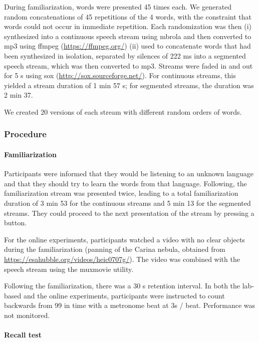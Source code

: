 \documentclass[]{article}
\let\oldparagraph\paragraph
\renewcommand{\paragraph}[1]{\oldparagraph{#1}\mbox{}}
\begin{document}
During familiarization, words were presented 45 times each. We generated random concatenations of 45 repetitions of the 4 words, with the constraint that words could not occur in immediate repetition. Each randomization was then (i) synthesized into a continuous speech stream using mbrola and then converted to mp3 using ffmpeg (\url{https://ffmpeg.org/}) (ii) used to concatenate words that had been synthesized in isolation, separated by silences of 222 ms into a segmented speech stream, which was then converted to mp3. Streams were faded in and out for 5 s using sox (\url{http://sox.sourceforge.net/}). For continuous streams, this yielded a stream duration of 1 min 57 s; for segmented streams, the duration was 2 min 37.

We created 20 versions of each stream with different random orders of words.

\clearpage

\subsubsection{Procedure}\label{procedure-1}

\paragraph{Familiarization}\label{familiarization}

Participants were informed that they would be listening to an unknown language and that they should try to learn the words from that language. Following, the familiarization stream was presented twice, leading to a total familiarization duration of 3 min 53 for the continuous streams and 5 min 13 for the segmented streams. They could proceed to the next presentation of the stream by pressing a button.

For the online experiments, participants watched a video with no clear objects during the familiarization (panning of the Carina nebula, obtained from \url{https://esahubble.org/videos/heic0707g/}). The video was combined with the speech stream using the muxmovie utility.

Following the familiarization, there was a 30 s retention interval. In both the lab-based and the online experiments, participants were instructed to count backwards from 99 in time with a metronome beat at 3s / beat. Performance was not monitored.

\paragraph{Recall test}\label{recall-test}
\end{document}
